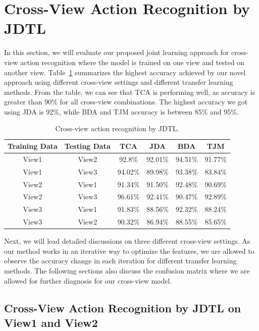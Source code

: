 \section{Cross-View Action Recognition by JDTL}
In this section, we will evaluate our proposed joint learning approach for cross-view action recognition where the model is trained on one view and tested on another view. Table~\ref{table4:topnovel} summarizes the highest accuracy achieved by our novel approach using different cross-view settings and different transfer learning methods. From the table, we can see that TCA is performing well, as accuracy is greater than 90\% for all cross-view combinations. The highest accuracy we got using JDA is 92\%, while BDA and TJM accuracy is between 85\% and 95\%. 


\begin{table}[!ht]
	\centering
	\caption{Cross-view action recognition by JDTL.} 
	\begin{tabular}{@{\extracolsep{20pt}}cccccc}
		\toprule   
		Training Data & Testing Data &  TCA & JDA & BDA & TJM\\ 
		\hline
		\midrule
		View1&  View2	& 92.8\%  & 92.01\% &	94.51\%	 &91.77\%\\
		View1&	View3	& 94.02\%  &	89.98\%	&	93.38\%	&	83.84\%\\
		View2&	View1	& 91.34\% &	91.50\%	&	92.48\%	&	90.69\%\\
		View2&  View3	& 96.61\% &	92.41\%	&	90.47\%	&	92.89\%\\
		View3&	View1	& 91.83\% &	88.56\%	&	92.32\%	&	88.24\%\\
		View3&	View2	& 90.32\% &	86.94\%	&	88.55\%	&	85.65\%\\
		\bottomrule
		\hline
		\midrule
	\end{tabular}%
	\label{table4:topnovel}
\end{table}
Next, we will lead detailed discussions on three different cross-view settings. As our method works in an iterative way to optimize the features, we are allowed to observe the accuracy change in each iteration for different transfer learning methods. The following sections also discuss the confusion matrix where we are allowed for further diagnosis for our cross-view model.

\subsection{Cross-View Action Recognition by JDTL on View1 and View2}

